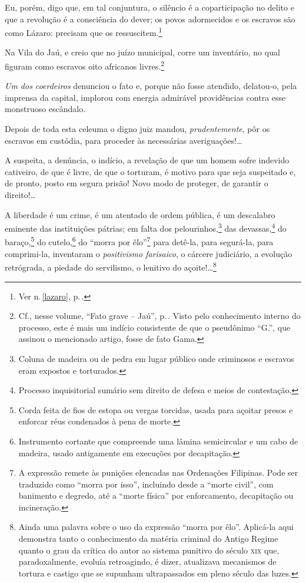 Eu, porém, digo que, em tal conjuntura, o silêncio é a coparticipação no
delito e que a revolução é a consciência do dever; os povos adormecidos
e os escravos são como Lázaro: precisam que os ressuscitem.\footnote{Ver n.\,\ref{lazaro}, p.\,\pageref{lazaro}.}

Na Vila do Jaú, e creio que no juízo municipal, corre um inventário, no
qual figuram como escravos oito africanos livres.\footnote{Cf., nesse
  volume, ``Fato grave -- Jaú'', p.\,\pageref{jau}. Visto pelo conhecimento
  interno do processo, este é mais um indício consistente de que o
  pseudônimo ``G.'', que assinou o mencionado artigo, fosse de fato Gama.}

\emph{Um dos coerdeiros} denunciou o fato e, porque não fosse atendido,
delatou-o, pela imprensa da capital, implorou com energia admirável
providências contra esse monstruoso escândalo.

Depois de toda esta celeuma o digno juiz mandou, \emph{prudentemente},
pôr os escravos em custódia, para proceder às necessárias
averiguações!\ldots{}

A suspeita, a denúncia, o indício, a revelação de que um homem sofre
indevido cativeiro, de que é livre, de que o torturam, é motivo para que
seja suspeitado e, de pronto, posto em segura prisão! Novo modo de
proteger, de garantir o direito!\ldots{}

A liberdade é um crime, é um atentado de ordem pública, é um descalabro
eminente das instituições pátrias; em falta dos pelourinhos,\footnote{
  Coluna de madeira ou de pedra em lugar público onde criminosos e
  escravos eram expostos e torturados.} das devassas,\footnote{
  Processo inquisitorial sumário sem direito de defesa e meios de
  contestação.} do baraço,\footnote{Corda feita de fios de estopa ou
  vergas torcidas, usada para açoitar presos e enforcar réus condenados
  à pena de morte.} do cutelo,\footnote{Instrumento cortante que
  compreende uma lâmina semicircular e um cabo de madeira, usado
  antigamente em execuções por decapitação.} do ``morra por
êlo''\footnote{A expressão remete às punições elencadas nas Ordenações
  Filipinas. Pode ser traduzido como ``morra por isso'', incluindo desde a
  ``morte civil'', com banimento e degredo, até a ``morte física'' por
  enforcamento, decapitação ou incineração.} para detê-la, para
segurá-la, para comprimi-la, inventaram o \emph{positivismo farisaico},
o cárcere judiciário, a evolução retrógrada, a piedade do servilismo, o
lenitivo do açoite!\ldots{}\footnote{Ainda uma palavra sobre o uso
  da expressão ``morra por êlo''. Aplicá-la aqui demonstra tanto o
  conhecimento da matéria criminal do Antigo Regime quanto o grau da
  crítica do autor ao sistema punitivo do século \textsc{xix} que,
  paradoxalmente, evoluía retroagindo, é dizer, atualizava mecanismos de
  tortura e castigo que se supunham ultrapassados em pleno século das
  luzes.}

